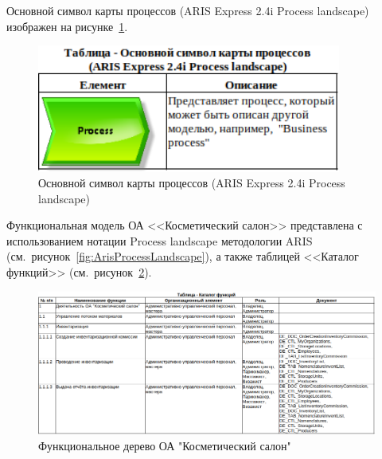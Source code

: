 Основной символ карты процессов (ARIS Express 2.4i \cite{ArisExpress} Process landscape)
изображен на рисунке~\ref{fig:ProcessLandscapeElement}.

\begin{figure}[!h]
    \centering

    \includegraphics[width=10cm]
    {assets/ARIS/ProcessLandscape/Element/ProcessLandscapeElement.png}

    \caption{Основной символ карты процессов (ARIS Express 2.4i Process landscape)}

    \label{fig:ProcessLandscapeElement}
\end{figure}

Функциональная модель ОА <<Косметический салон>> представлена
с использованием нотации Process landscape методологии ARIS
(см.~рисунок~\ref{fig:ArisProcessLandscape}),
а также таблицей <<Каталог функций>>
(см.~рисунок~\ref{fig:ProcessLandscapeCatalog}).



\begin{figure}[!h]
    \centering

    \includegraphics[width=16cm]
    {assets/ARIS/ProcessLandscape/Catalog/ProcessLandscapeCatalog.png}

    \caption{Функциональное дерево ОА "Косметический салон"}

    \label{fig:ProcessLandscapeCatalog}
\end{figure}

